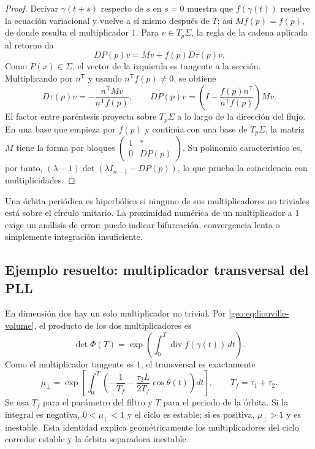 \begin{proof}
Derivar \(\gamma(t+s)\) respecto de \(s\) en \(s=0\) muestra que
\(f(\gamma(t))\) resuelve la ecuación variacional y vuelve a sí mismo después
de \(T\); así \(Mf(p)=f(p)\), de donde resulta el multiplicador \(1\).
Para \(v\in T_p\Sigma\), la regla de la cadena aplicada al retorno da
\[
 DP(p)v=Mv+f(p)D\tau(p)v.
\]
Como \(P(x)\in\Sigma\), el vector de la izquierda es tangente a la
sección. Multiplicando por \(n^{\mathsf T}\) y usando
\(n^{\mathsf T}f(p)\ne0\), se obtiene
\[
 D\tau(p)v=-\frac{n^{\mathsf T}Mv}{n^{\mathsf T}f(p)},\qquad
 DP(p)v=\left(I-\frac{f(p)n^{\mathsf T}}
 {n^{\mathsf T}f(p)}\right)Mv.
\]
El factor entre paréntesis proyecta sobre \(T_p\Sigma\) a lo largo de la
dirección del flujo. En una base que empieza por \(f(p)\) y continúa con
una base de \(T_p\Sigma\), la matriz \(M\) tiene la forma por bloques
\(\left(\begin{smallmatrix}1&*\\0&DP(p)\end{smallmatrix}\right)\).
Su polinomio característico es, por tanto,
\((\lambda-1)\det(\lambda I_{n-1}-DP(p))\), lo que prueba la
coincidencia con multiplicidades.
\end{proof}



Una órbita periódica es hiperbólica si ninguno de sus multiplicadores no
triviales está sobre el círculo unitario. La proximidad numérica de un
multiplicador a \(1\) exige un análisis de error: puede indicar bifurcación,
convergencia lenta o simplemente integración insuficiente.

\subsection{Ejemplo resuelto: multiplicador transversal del PLL}

En dimensión dos hay un solo multiplicador no trivial. Por
\eqref{geo:eq:liouville-volume}, el producto de los dos multiplicadores es
\begin{equation}
 \det\Phi(T)=
 \exp\!\left(\int_0^T\operatorname{div}f(\gamma(t))\,dt\right).
\end{equation}
Como el multiplicador tangente es \(1\), el transversal es exactamente
\begin{equation}
 \mu_\perp=
 \exp\!\left[\int_0^T
 \left(-\frac1{T_{\!f}}
 -\frac{\tau_2L}{2T_{\!f}}\cos\theta(t)\right)dt\right],
 \qquad T_{\!f}=\tau_1+\tau_2.
 \label{geo:eq:pll-floquet-divergence}
\end{equation}
Se usa \(T_f\) para el parámetro del filtro y \(T\) para el periodo de la
órbita. Si la integral es negativa, \(0<\mu_\perp<1\) y el ciclo es estable;
si es positiva, \(\mu_\perp>1\) y es inestable. Esta identidad explica
geométricamente los multiplicadores del ciclo corredor estable
y la órbita separadora inestable.

